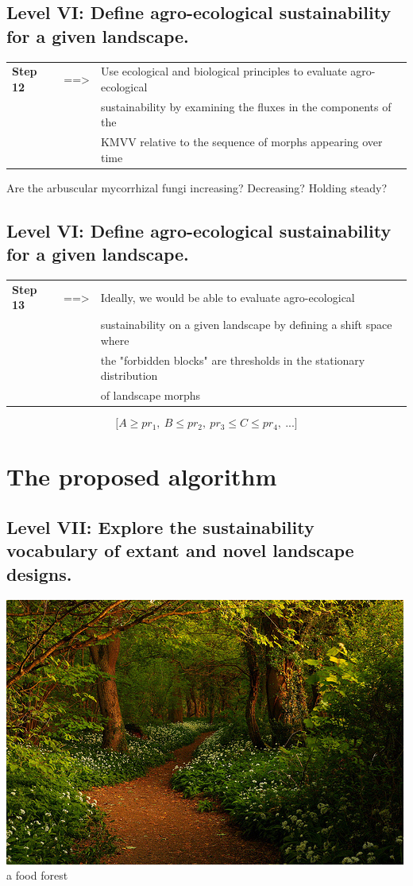 \documentclass[
paper=128mm:96mm, %
fontsize=11pt, %
pagesize, %
parskip=half-, %
]{scrartcl} %
\theoremstyle{mythmstyle} %
\begin{document}
\subsection{Level VI: Define agro-ecological sustainability for a given landscape.}
\footnotesize 
\begin{tabular}{lll}
	\textbf{Step 12} & ==> & Use ecological and biological principles to evaluate agro-ecological\\
	& & sustainability by examining the fluxes in the components of the \\
	& & KMVV relative to the sequence of morphs appearing over time
\end{tabular}
\begin{flushleft}
Are the arbuscular mycorrhizal fungi increasing? Decreasing? Holding steady?
\end{flushleft}
\clearpage
\subsection{Level VI: Define agro-ecological sustainability for a given landscape.}
\footnotesize 
\begin{tabular}{lll}
	\textbf{Step 13} & ==> & Ideally, we would be able to evaluate agro-ecological \\ 
	& & sustainability on a given landscape by defining a shift space where \\
	& & the "forbidden blocks" are thresholds in the stationary distribution \\
	& & of landscape morphs
\end{tabular}
\begin{equation*}
\big[ A\geq  pr_{1}, \ B\leq pr_{2}, \ pr_{3}\leq C \leq pr_{4}, \ ... \big]
\end{equation*}
\clearpage
\section{The proposed algorithm}
\subsection{Level VII: Explore the sustainability vocabulary of extant and novel landscape designs.}
\centering \includegraphics[height=4 cm]{Image24.jpg}\\
a food forest
\clearpage
\end{document}
